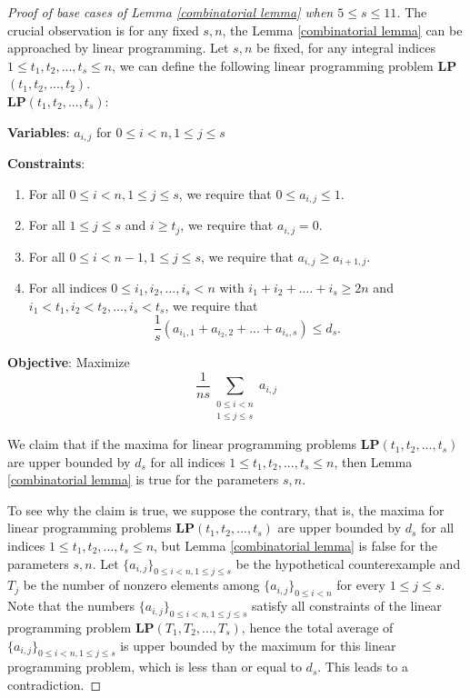 \documentclass[11pt]{amsart}
\theoremstyle{plain} %
\theoremstyle{remark}
\numberwithin{equation}{section}
\begin{document}
\begin{proof}[Proof of base cases of Lemma \ref{combinatorial lemma} when $5\leq s\leq 11$]
    The crucial observation is for any fixed $s,n$, the Lemma \ref{combinatorial lemma} can be approached by linear programming. Let $s,n$ be fixed, for any integral indices $1\leq t_1,t_2,...,t_s\leq n$, we can define the following linear programming problem \textbf{LP}$(t_1,t_2,...,t_2)$.\\

    \noindent\textbf{LP}$(t_1,t_2,...,t_s)$:
    
    \textbf{Variables}: $a_{i,j}$ for $0\leq i<n, 1\leq j\leq s$
    
    \textbf{Constraints}:
    \begin{enumerate}
        \item For all $0\leq i<n, 1\leq j\leq s$, we require that $0\leq a_{i,j}\leq 1$.
        \item For all $1\leq j\leq s$ and $i\geq t_j$, we require that $a_{i,j}=0$.
        \item For all $0\leq i<n-1, 1\leq j\leq s$, we require that $a_{i,j}\geq a_{i+1,j}$.
        \item For all indices $0\leq i_1,i_2,...,i_s<n$ with $i_1+i_2+....+i_s\geq 2n$ and $i_1<t_1,i_2<t_2,...,i_s<t_s$, we require that
        \begin{equation*}
            \frac{1}{s}(a_{i_1,1}+a_{i_2,2}+...+a_{i_s,s})\leq d_s.
        \end{equation*}
    \end{enumerate}
    
    \textbf{Objective}: Maximize
    \begin{equation*}
        \frac{1}{ns}\sum_{\substack{0\leq i<n\\1\leq j\leq s}} a_{i,j}
    \end{equation*}
    
    We claim that if the maxima for linear programming problems \textbf{LP}$(t_1,t_2,...,t_s)$ are upper bounded by $d_s$ for all indices $1\leq t_1,t_2,...,t_s\leq n$, then Lemma \ref{combinatorial lemma} is true for the parameters $s,n$. 
    
    To see why the claim is true, we suppose the contrary, that is, the maxima for linear programming problems \textbf{LP}$(t_1,t_2,...,t_s)$ are upper bounded by $d_s$ for all indices $1\leq t_1,t_2,...,t_s\leq n$, but Lemma \ref{combinatorial lemma} is false for the parameters $s,n$. Let $\{a_{i,j}\}_{0\leq i<n, 1\leq j\leq s}$ be the hypothetical counterexample and $T_j$ be the number of nonzero elements among $\{a_{i,j}\}_{0\leq i<n}$ for every $1\leq j\leq s$. Note that the numbers $\{a_{i,j}\}_{0\leq i<n, 1\leq j\leq s}$ satisfy all constraints of the linear programming problem \textbf{LP}$(T_1,T_2,...,T_s)$, hence the total average of $\{a_{i,j}\}_{0\leq i<n, 1\leq j\leq s}$ is upper bounded by the maximum for this linear programming problem, which is less than or equal to $d_s$. This leads to a contradiction.


\end{proof}
\end{document}
